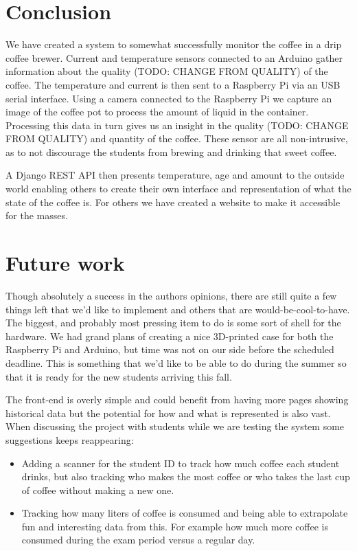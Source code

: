 \documentclass[12pt,a4paper,oneside,article]{memoir}
\numberwithin{equation}{chapter}
\begin{document}
\section{Conclusion}\label{sec:conclusion}
We have created a system to somewhat successfully monitor the coffee in a drip
coffee brewer. Current and temperature sensors connected to an Arduino gather
information about the quality (TODO: CHANGE FROM QUALITY) of the coffee. The 
temperature and current is then sent to a Raspberry Pi via an USB serial 
interface. Using a camera connected to the Raspberry Pi we capture an image of 
the coffee pot to process the amount of liquid in the container. Processing this 
data in turn gives us an insight in the quality (TODO: CHANGE FROM QUALITY) and 
quantity of the coffee. These sensor are all non-intrusive, as to not discourage 
the students from brewing and drinking that sweet coffee.

A Django REST API then presents temperature, age and amount to the outside 
world enabling others to create their own interface and representation of what
the state of the coffee is. For others we have created a website to make it 
accessible for the masses.
 
\section{Future work}\label{sec:future-work}
Though absolutely a success in the authors opinions, there are still quite a few
things left that we'd like to implement and others that are
would-be-cool-to-have. The biggest, and probably most pressing item to do is
some sort of shell for the hardware. We had grand plans of creating a nice
3D-printed case for both the Raspberry Pi and Arduino, but time was not on our
side before the scheduled deadline. This is something that we'd like to be able
to do during the summer so that it is ready for the new students arriving this
fall.

The front-end is overly simple and could benefit from having more pages showing
historical data but the potential for how and what is represented is also vast.
When discussing the project with students while we are testing the system some
suggestions keeps reappearing:

\begin{itemize}
\item Adding a scanner for the student ID to track how much coffee each student
  drinks, but also tracking who makes the most coffee or who takes the last cup
  of coffee without making a new one.
\item Tracking how many liters of coffee is consumed and being able to
  extrapolate fun and interesting data from this. For example how much more
  coffee is consumed during the exam period versus a regular day.
\end{itemize}
\end{document}
